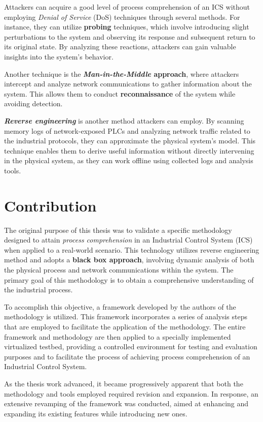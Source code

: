 Attackers can acquire a good level of process comprehension of an ICS without employing \textit{Denial of Service} (DoS) techniques through several methods.  For instance, they can utilize \textbf{probing} techniques, which involve introducing slight perturbations to the system and observing its response and subsequent return to its original state. By analyzing these reactions, attackers can gain valuable insights into the system's behavior.

Another technique is the \textbf{\textit{Man-in-the-Middle} approach}, where attackers intercept and analyze network communications to gather information about the system. This allows them to conduct \textbf{reconnaissance} of the system while avoiding detection.

\textbf{\textit{Reverse engineering}} is another method attackers can employ. By scanning memory logs of network-exposed PLCs and analyzing network traffic related to the industrial protocols, they can approximate the physical system's model. This technique enables them to derive useful information without directly intervening in the physical system, as they can work offline using collected logs and analysis tools.

\section{Contribution}
\label{sec:1_contribution}

The original purpose of this thesis was to validate a specific methodology designed to attain \textit{process comprehension} in an Industrial Control System (ICS) when applied to a real-world scenario. This technology utilizes reverse engineering method and adopts a \textbf{black box approach}, involving dynamic analysis of both the physical process and network communications within the system. The primary goal of this methodology is to obtain a comprehensive understanding of the industrial process.

\bigskip
To accomplish this objective, a framework developed by the authors of the methodology is utilized. This framework incorporates a series of analysis steps that are employed to facilitate the application of the methodology. The entire framework and methodology are then applied to a specially implemented virtualized testbed, providing a controlled environment for testing and evaluation purposes and to facilitate the process of achieving process comprehension of an Industrial Control System.

As the thesis work advanced, it became progressively apparent that both the methodology and tools employed required revision and expansion. In response, an extensive revamping of the framework was conducted, aimed at enhancing and expanding its existing features while introducing new ones.

